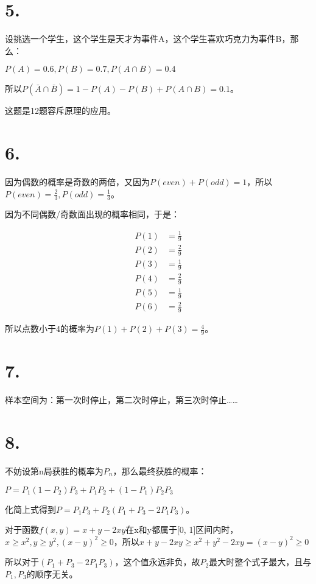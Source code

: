 \documentclass[UTF8]{report}
\begin{document}
    \section*{5.}
        设挑选一个学生，这个学生是天才为事件A，这个学生喜欢巧克力为事件B，那么：

        $P(A) = 0.6, P(B) = 0.7, P(A \cap B) = 0.4$

        所以$P(\bar A \cap \bar B) = 1 - P(A) - P(B) + P(A \cap B) = 0.1$。

        这题是12题容斥原理的应用。
    \section*{6.}
        因为偶数的概率是奇数的两倍，又因为$P(even) + P(odd) = 1$，所以$P(even) = \frac{2}{3}, P(odd) = \frac{1}{3}$。

        因为不同偶数/奇数面出现的概率相同，于是：

        $$\begin{array}{rcl}
            P(1) &= \frac{1}{9} \\
            P(2) &= \frac{2}{9} \\ 
            P(3) &= \frac{1}{9} \\ 
            P(4) &= \frac{2}{9} \\ 
            P(5) &= \frac{1}{9} \\
            P(6) &= \frac{2}{9}
        \end{array}$$

        所以点数小于4的概率为$P(1) + P(2) + P(3) = \frac{4}{9}$。
    \section*{7.}
        样本空间为：第一次时停止，第二次时停止，第三次时停止……
    \section*{8.}
        不妨设第n局获胜的概率为$P_n$，那么最终获胜的概率：
        
        $P = P_1(1 - P_2)P_3 + P_1P_2 + (1 - P_1)P_2P_3$

        化简上式得到$P = P_1P_3 + P_2(P_1 + P_3 - 2P_1P_3)$。

        对于函数$f(x, y) = x + y - 2xy$在x和y都属于[0, 1]区间内时，$x \geq x^2, y \geq y^2, (x - y)^2 \geq 0$，所以$x + y - 2xy \geq x^2 + y^2 -2xy = (x - y)^2 \geq 0$

        所以对于$(P_1 + P_3 - 2P_1P_3)$，这个值永远非负，故$P_2$最大时整个式子最大，且与$P_1,P_3$的顺序无关。
\end{document}
